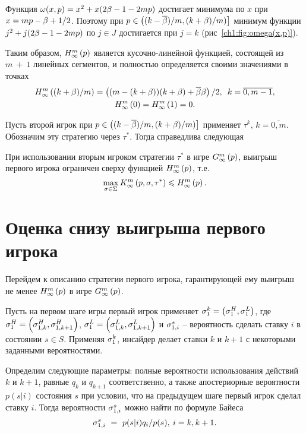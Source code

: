 {Функция $\omega(x, p) = x^2 + x(2\Co - 1 - 2mp)$ достигает минимума по $x$ при $x = m p - \Co + 1/2$.
Поэтому при $p \in \left( (k-\DCo)/m, (k+\Co)/m) \right]$ минимум функции $j^2 + j(2\Co - 1 - 2 m p)$ по $j \in J$ достигается при $j = k$ (\seename рис~\ref{ch1:fig:omega(x,p)}).

Таким образом, $\upperBound{p}$ является кусочно-линейной функцией, состоящей из $m~+~1$ линейных сегментов, и полностью определяется своими значениями в точках
\begin{gather*}
  \upperBound{(k+\Co)/m} = \left( (m - (k + \Co))(k + \Co) + \DCo\Co
  \right) / 2, \enskip
  k = \overline{0, m - 1},\\
  \upperBound{0} = \upperBound{1} = 0.
\end{gather*}

Пусть второй игрок при $p \in \left( (k-\DCo)/m, (k+\Co)/m) \right]$ применяет $\tau^k, \, k = \overline{0, m}$.
Обозначим эту стратегию через $\tau^*$.
Тогда справедлива следующая
\begin{lemma}
  \label{ch1:lemma:upperBound}
  При использовании вторым игроком стратегии $\tau^*$ в игре $\infiniteGame{p}$\textup{,} выигрыш первого игрока ограничен сверху функцией $\upperBound{p}$, т.е.
  \[
    \max_{\sigma \in \Sigma} \infiniteFirstPlayerPayoff{p}{\sigma}{\tau^*} \leq
    \upperBound{p}.
  \]
\end{lemma}

\section{Оценка снизу выигрыша первого игрока}\label{ch1:lower-bound}
Перейдем к описанию стратегии первого игрока, гарантирующей ему выигрыш не менее $\upperBound{p}$ в игре $\infiniteGame{p}$.

Пусть на первом шаге игры первый игрок применяет %
$\fGeneral{k} = \left(\fGeneral{H}, \fGeneral{L}\right)$, где %
$\fGeneral{H} = \left(\fGeneral[1,k]{H}, \fGeneral[1,k+1]{H}\right)$,
$\fGeneral{L} = \left(\fGeneral[1,k]{L}, \fGeneral[1,k+1]{L}\right)$ и
$\fGeneral[1,i]{s}$ -- вероятность сделать ставку $i$ в состоянии $s \in S$.
Применяя $\fGeneral{k}$, инсайдер делает ставки $k$ и $k+1$ с некоторыми заданными вероятностями.

Определим следующие параметры: полные вероятности использования действий $k$ и $k+1$, равные $q_k$ и $q_{k+1}$ соответственно, а также апостериорные вероятности $p(s|i)$ состояния $s$ при условии, что на предыдущем шаге первый игрок сделал ставку $i$.
Тогда вероятности $\fGeneral[1,i]{s}$ можно найти по формуле Байеса
\[
  \fGeneral[1,i]{s}~=~p(s|i)q_i/p(s), \: i = k, k + 1.
\]

}

